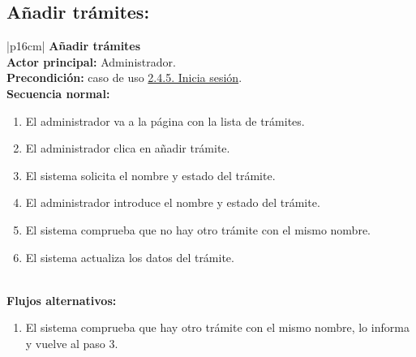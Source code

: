     \subsection{Añadir trámites:}
        \begin{longtable}{|p{16cm}|} 
        \hline
        \textbf{Añadir trámites} \\ \hline
        \textbf{Actor principal:} Administrador. \\ \hline
        \textbf{Precondición:} caso de uso \hyperref[subsec:2.4.5.]{2.4.5. Inicia sesión}. \\ \hline
        \textbf{Secuencia normal:} \\
        \begin{minipage}[t]{\linewidth}
            \begin{enumerate}
                \item El administrador va a la página con la lista de trámites.
                \item El administrador clica en añadir trámite.
                \item El sistema solicita el nombre y estado del trámite.
                \item El administrador introduce el nombre y estado del trámite.
                \item El sistema comprueba que no hay otro trámite con el mismo nombre.
                \item El sistema actualiza los datos del trámite.
            \end{enumerate}
            \vspace{1mm}
        \end{minipage} \\ \hline
        \textbf{Flujos alternativos:} \\
        \begin{minipage}[t]{\linewidth}
            \begin{enumerate}
                \item[5.a.] El sistema comprueba que hay otro trámite con el mismo nombre, lo informa y vuelve al paso 3.
            \end{enumerate}
            \vspace{1mm}
        \end{minipage} \\ \hline
        \caption{Descripción general del caso de uso - Añadir trámites.}
        \end{longtable}

